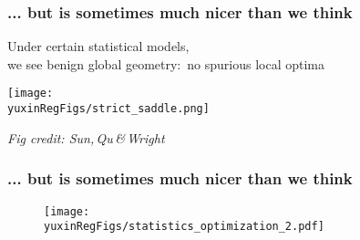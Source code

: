\documentclass[compress,
mathserif,wide,%
]{beamer}
\newcommand{\yuxinRegFigs}{figure}
\begin{document}
\begin{frame}
\frametitle{... but is sometimes much nicer than we think}



{

\begin{varblock}[\textwidth]{}
\begin{center}
  	Under certain \alert{statistical models}, \\ we see benign global geometry:~\alert{no spurious local optima}
\end{center}
\end{varblock}
}



\begin{center}
  \texttt{[image: \\yuxinRegFigs/strict\_saddle.png]}
\end{center}


\vspace{-1em}
\hfill {\footnotesize{\em Fig credit: Sun,\,Qu\,\&\,Wright}}



\end{frame}





\begin{frame}[plain]
\frametitle{... but is sometimes much nicer than we think}

\vfill

\begin{figure}
	\texttt{[image: \\yuxinRegFigs/statistics\_optimization\_2.pdf]}
\end{figure}

\vfill

\end{frame}



%
%
%
\end{document}
